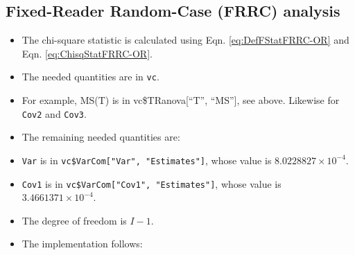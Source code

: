 \documentclass[
]{book}
\newenvironment{Shaded}{\begin{snugshade}}{\end{snugshade}}
\newcommand{\CommentTok}[1]{\textcolor[rgb]{0.56,0.35,0.01}{\textit{#1}}}
\newcommand{\DataTypeTok}[1]{\textcolor[rgb]{0.13,0.29,0.53}{#1}}
\newcommand{\DecValTok}[1]{\textcolor[rgb]{0.00,0.00,0.81}{#1}}
\newcommand{\KeywordTok}[1]{\textcolor[rgb]{0.13,0.29,0.53}{\textbf{#1}}}
\newcommand{\NormalTok}[1]{#1}
\newcommand{\OperatorTok}[1]{\textcolor[rgb]{0.81,0.36,0.00}{\textbf{#1}}}
\newcommand{\OtherTok}[1]{\textcolor[rgb]{0.56,0.35,0.01}{#1}}
\newcommand{\StringTok}[1]{\textcolor[rgb]{0.31,0.60,0.02}{#1}}
\providecommand{\tightlist}{%
  \setlength{\itemsep}{0pt}\setlength{\parskip}{0pt}}
\begin{document}
\begin{Shaded}
\end{Shaded}

\hypertarget{ORApplications-FRRC-dataset02-hand}{%
\subsection{Fixed-Reader Random-Case (FRRC) analysis}\label{ORApplications-FRRC-dataset02-hand}}

\begin{itemize}
\tightlist
\item
  The chi-square statistic is calculated using Eqn. \eqref{eq:DefFStatFRRC-OR} and Eqn. \eqref{eq:ChisqStatFRRC-OR}.
\item
  The needed quantities are in \texttt{vc}.
\item
  For example, MS(T) is in vc\$TRanova{[}``T'', ``MS''{]}, see above. Likewise for \texttt{Cov2} and \texttt{Cov3}.
\item
  The remaining needed quantities are:
\item
  \texttt{Var} is in \texttt{vc\$VarCom{[}"Var",\ "Estimates"{]}}, whose value is \ensuremath{8.0228827\times 10^{-4}}.
\item
  \texttt{Cov1} is in \texttt{vc\$VarCom{[}"Cov1",\ "Estimates"{]}}, whose value is \ensuremath{3.4661371\times 10^{-4}}.
\item
  The degree of freedom is \(I-1\).
\item
  The implementation follows:
\end{itemize}
\end{document}
